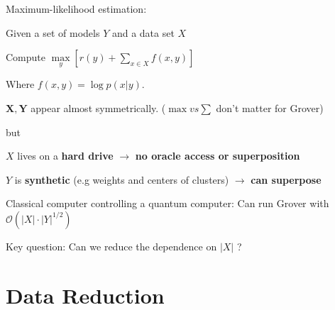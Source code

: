 \documentclass[
  ignorenonframetext,
]{beamer}
\begin{document}
\begin{frame}{}
\protect\hypertarget{section-2}{}
\begin{block}{Maximum-likelihood estimation:}
\protect\hypertarget{maximum-likelihood-estimation}{}
\begin{small}

Given a set of models $Y$ and a data set $X$

Compute $\max \limits_{y} [ r(y) + \sum_{x \in X} f(x, y) ]$

Where $f(x, y) = \log p(x | y)$.

\end{small}
\end{block}

\pause

\begin{block}{}
\protect\hypertarget{section-3}{}
\begin{small}

$\mathbf{X, Y}$ appear almost symmetrically. ($\max vs \sum$ don't matter for Grover)

but

$X$ lives on a \textbf{hard drive} $\rightarrow$ \textbf{no oracle access or superposition}

$Y$ is \textbf{synthetic} (e.g weights and centers of clusters) $\rightarrow$ \textbf{can superpose}

\end{small}
\end{block}

\pause

\begin{block}{}
\protect\hypertarget{section-4}{}
\begin{small}
Classical computer controlling a quantum computer:
Can run Grover with $\mathcal{O}{(\left|X\right| \cdot \left|Y\right|^{1/2})}$
\end{small}
\end{block}

\centering

Key question: Can we reduce the dependence on \(\left|X\right|\) ?
\end{frame}

\hypertarget{data-reduction}{%
\section{Data Reduction}\label{data-reduction}}
\end{document}

